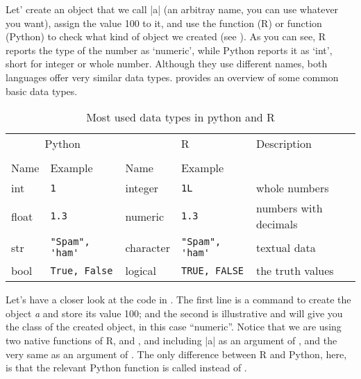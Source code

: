 Let' create an object that we call |a| (an arbitray name, you can use
whatever you want), assign the value 100 to it, and use the 
function (R) or  function (Python) to check what kind of
object we created (see ).
As you can see, R reports the type of the number as `numeric', while Python reports it
as `int', short for integer or whole number.  Although they use
different names, both languages offer very similar data types.
 provides an overview of some common basic data types.


\newcommand{\fndouble}{In R, double and numeric can generally be used
  interchangably (there is a subtle difference, but that is not
  relevant here).}

\begin{table}
  \caption{\label{tab:types}Most used data types in python and R}{
  \begin{tabularx}{\textwidth}{lllll}
    \toprule
    \multicolumn{2}{c}{Python} & \multicolumn{2}{c}{R}& Description \\
    \cmidrule(lr){1-2}    \cmidrule(lr){3-4}\\
    Name & Example & Name & Example \\
    \midrule
    int   & \verb+1+             & integer   & \verb+1L+             & whole numbers \\
    float & \verb+1.3+           & numeric   & \verb+1.3+           & numbers with decimals \\
    str   & \verb+"Spam", 'ham'+ & character & \verb+"Spam", 'ham'+ & textual data  \\ 
    bool  & \verb+True, False+   & logical   & \verb+TRUE, FALSE+   & the truth values \\
    \bottomrule
  \end{tabularx}}{}
\end{table}
    


Let's have a closer look at the code in .
The first line is a command to create the object \emph{a} and store
its value 100; and the second is illustrative and will give you the
class of the created object, in this case ``numeric''. Notice that we
are using two native functions of R,  and , and
including |a| as an argument of , and the very same
 as an argument of . The only difference
between R and Python, here, is that the relevant Python function is
called  instead of .


